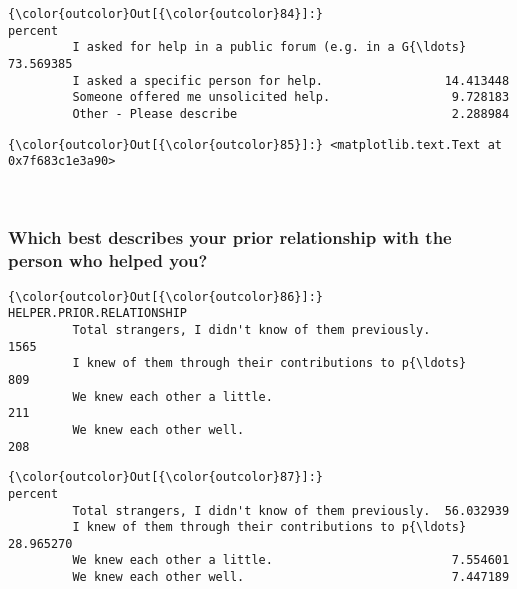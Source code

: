 \documentclass[11pt]{article}
\begin{document}
            \begin{Verbatim}[commandchars=\\\{\}]
{\color{outcolor}Out[{\color{outcolor}84}]:}                                                       percent
         I asked for help in a public forum (e.g. in a G{\ldots}  73.569385
         I asked a specific person for help.                 14.413448
         Someone offered me unsolicited help.                 9.728183
         Other - Please describe                              2.288984
\end{Verbatim}
        

            \begin{Verbatim}[commandchars=\\\{\}]
{\color{outcolor}Out[{\color{outcolor}85}]:} <matplotlib.text.Text at 0x7f683c1e3a90>
\end{Verbatim}
        
    \begin{center}
    \end{center}
    { \hspace*{\fill} \\}
    
    \subsubsection{Which best describes your prior relationship with the
person who helped
you?}\label{which-best-describes-your-prior-relationship-with-the-person-who-helped-you}


            \begin{Verbatim}[commandchars=\\\{\}]
{\color{outcolor}Out[{\color{outcolor}86}]:}                                                     HELPER.PRIOR.RELATIONSHIP
         Total strangers, I didn't know of them previously.                       1565
         I knew of them through their contributions to p{\ldots}                        809
         We knew each other a little.                                              211
         We knew each other well.                                                  208
\end{Verbatim}
        

            \begin{Verbatim}[commandchars=\\\{\}]
{\color{outcolor}Out[{\color{outcolor}87}]:}                                                       percent
         Total strangers, I didn't know of them previously.  56.032939
         I knew of them through their contributions to p{\ldots}  28.965270
         We knew each other a little.                         7.554601
         We knew each other well.                             7.447189
\end{Verbatim}
        
\end{document}
